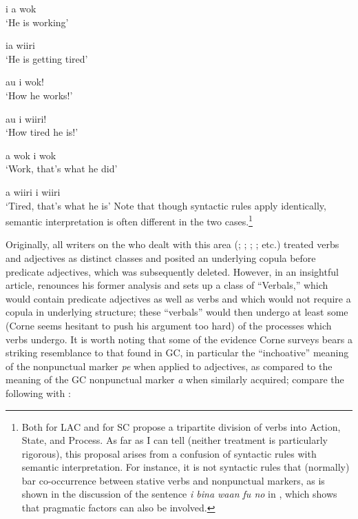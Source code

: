 \ea\label{ex:2:65}
i a wok\\
\glt `He is working'
\z

\ea\label{ex:2:66}
ia {wiiri}\\
\glt `He is getting tired'
\z

\ea\label{ex:2:67}
au i wok!\\
\glt `How he works!'
\z

\ea\label{ex:2:68}
{au} {i} {wiiri!}\\
\glt `How tired he is!'
\z

\ea\label{ex:2:69}
 {a} {wok} {i} {wok}\\
\glt `Work, that's what he did'
\z

\ea\label{ex:2:70}
{a} {wiiri} {i} {wiiri}\\
\glt `Tired, that's what he is' 
\z
Note that though syntactic rules apply identically, semantic interpre\-tation is often different in the two cases.\footnote{Both \citet{Christie1976} for LAC and \citet{Corne1981} for SC propose a tripartite division of verbs into Action, State, and Process. As far as I can tell (neither treatment is particularly rigorous), this proposal arises from a confusion of syntactic rules with semantic interpretation. For instance, it is not syntactic rules that (normally) bar co-occurrence between stative verbs and nonpunctual markers, as is shown in the discussion of the sentence \textit{i bina waan fu no} in \citet[38]{Bickerton1975}, which shows that pragmatic factors can also be involved.}

Originally, all writers on the  who dealt with this area (\citealt{Baker1972}; \citealt{Corne1973,Corne1977}; \citealt{Papen1975,Papen1978}; \citealt{Bollee1977}; etc.) treated verbs and adjectives as distinct classes and posited an underlying copula before predicate adjectives, which was subsequently deleted. However, in an insightful article, \citet{Corne1981} renounces his former analysis and sets up a class of ``Verbals,'' which would contain predicate adjectives as well as verbs and which would not require a copula in underlying structure; these ``verbals'' would then undergo at least some (Corne seems hesitant to push his argument too hard) of the processes which verbs undergo. It is worth noting that some of the evidence Corne surveys bears a striking resemblance to that found in GC, in particular the ``inchoative'' meaning of the nonpunctual marker \textit{pe} when applied to adjectives, as compared to the meaning of the GC nonpunctual marker \textit{a} when similarly acquired; compare the following with :

